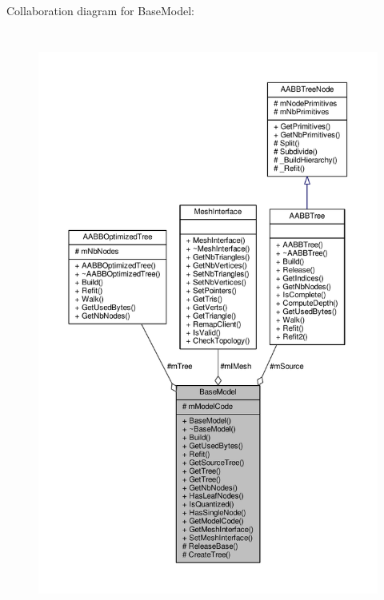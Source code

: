 Collaboration diagram for Base\+Model\+:
\nopagebreak
\begin{figure}[H]
\begin{center}
\leavevmode
\includegraphics[height=550pt]{d5/db0/classBaseModel__coll__graph}
\end{center}
\end{figure}
